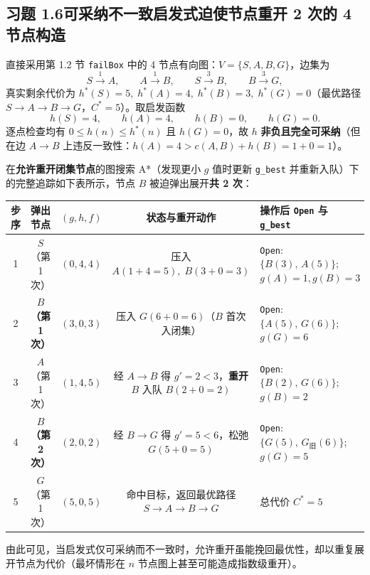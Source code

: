 \subsection*{习题 1.6\quad 可采纳不一致启发式迫使节点重开 2 次的 4 节点构造}
直接采用第 1.2 节 \texttt{failBox} 中的 4 节点有向图：$V = \{S, A, B, G\}$，边集为
\[
  S \xrightarrow{1} A,\qquad A \xrightarrow{1} B,\qquad S \xrightarrow{3} B,\qquad B \xrightarrow{3} G,
\]
真实剩余代价为 $h^*(S)=5,\; h^*(A)=4,\; h^*(B)=3,\; h^*(G)=0$（最优路径 $S\to A\to B\to G$，$C^*=5$）。取启发函数
\[
  h(S) = 4,\qquad h(A) = 4,\qquad h(B) = 0,\qquad h(G) = 0.
\]
逐点检查均有 $0 \le h(n) \le h^*(n)$ 且 $h(G)=0$，故 $h$ \textbf{非负且完全可采纳}（但在边 $A\to B$ 上违反一致性：$h(A)=4 > c(A,B)+h(B)=1+0=1$）。

在\textbf{允许重开闭集节点}的图搜索 A*（发现更小 $g$ 值时更新 \texttt{g\_best} 并重新入队）下的完整追踪如下表所示，节点 $B$ 被迫弹出展开\textbf{共 2 次}：

\begin{center}
\footnotesize
\begin{tabularx}{\linewidth}{@{}c c c c X@{}}
\toprule
\textbf{步序} & \textbf{弹出节点} & $(g, h, f)$ & \textbf{状态与重开动作} & \textbf{操作后 \texttt{Open} 与 \texttt{g\_best}} \\
\midrule
1 & $S$（第 1 次） & $(0,4,4)$ & 压入 $A(1{+}4{=}5),\; B(3{+}0{=}3)$ & \texttt{Open}: $\{B(3),\, A(5)\}$;\; $g(A){=}1, g(B){=}3$ \\
2 & \textbf{$B$（第 1 次）} & $(3,0,3)$ & 压入 $G(6{+}0{=}6)$（$B$ 首次入闭集） & \texttt{Open}: $\{A(5),\, G(6)\}$;\; $g(G){=}6$ \\
3 & $A$（第 1 次） & $(1,4,5)$ & 经 $A\to B$ 得 $g'=2 < 3$，\textbf{重开 $B$} 入队 $B(2{+}0{=}2)$ & \texttt{Open}: $\{B(2),\, G(6)\}$;\; $g(B){=}2$ \\
4 & \textbf{$B$（第 2 次）} & $(2,0,2)$ & 经 $B\to G$ 得 $g'=5 < 6$，松弛 $G(5{+}0{=}5)$ & \texttt{Open}: $\{G(5),\, G_{\text{旧}}(6)\}$;\; $g(G){=}5$ \\
5 & $G$（第 1 次） & $(5,0,5)$ & 命中目标，返回最优路径 $S\to A\to B\to G$ & 总代价 $C^*=5$ \\
\bottomrule
\end{tabularx}
\end{center}
由此可见，当启发式仅可采纳而不一致时，允许重开虽能挽回最优性，却以重复展开节点为代价（最坏情形在 $n$ 节点图上甚至可能造成指数级重开）。

